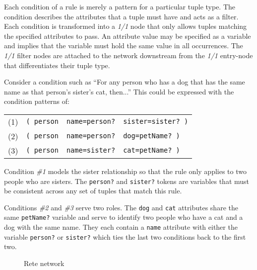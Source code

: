Each condition of a rule is merely a pattern for a particular tuple type.
The condition describes the attributes that a tuple must have and acts
as a filter.  Each condition is transformed into a \emph{1/1} node
that only allows tuples matching the specified attributes to pass.
An attribute value may be specified as a variable and implies that
the variable must hold the same value in all occurrences.
The \emph{1/1} filter nodes are attached to
the network downstream from the \emph{1/1} entry-node that
differentiates their tuple type.

Consider a condition such as ``For any person who has a dog that
has the same name as that person's sister's cat, then...''  This could
be expressed with the condition patterns of:

\medskip

\begin{tabular}{llll}

(1) & \texttt{( person} & \texttt{name=person?} & \texttt{sister=sister? )}\\
(2) & \texttt{( person} & \texttt{name=person?} & \texttt{dog=petName? )}\\
(3) & \texttt{( person} & \texttt{name=sister?} & \texttt{cat=petName? )}\\

\end{tabular}

\medskip

Condition \emph{\#1} models the sister relationship so
that the rule only applies to two people who are sisters.  The
\verb|person?| and \verb|sister?| tokens are variables that must be
consistent across any set of tuples that match this rule.  

Conditions \emph{\#2} and \emph{\#3} serve two roles.  The \verb|dog|
and \verb|cat| attributes share the same \verb|petName?| variable and
serve to identify two people who have a cat and a dog with the same
name.  They each contain a \verb|name| attribute with either the
variable \verb|person?| or \verb|sister?| which ties the last two
conditions back to the first two.

\begin{figure}[htbpc]
  \begin{center}
   \begin{minipage}{6in}
  \end{minipage}
  \end{center}
  \label{network.rete}
  \caption{Rete network}
\end{figure}

